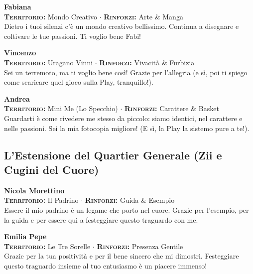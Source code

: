 \noindent\begin{minipage}{\linewidth}
\textbf{Fabiana} \\
{\footnotesize \textbf{\textsc{Territorio:}} Mondo Creativo $\cdot$ \textbf{\textsc{Rinforzi:}} Arte \& Manga} \\
Dietro i tuoi silenzi c'è un mondo creativo bellissimo. Continua a disegnare e coltivare le tue passioni. Ti voglio bene Fabi!
\end{minipage}
\vspace{0.6cm}

\noindent\begin{minipage}{\linewidth}
\textbf{Vincenzo} \\
{\footnotesize \textbf{\textsc{Territorio:}} Uragano Vinni $\cdot$ \textbf{\textsc{Rinforzi:}} Vivacità \& Furbizia} \\
Sei un terremoto, ma ti voglio bene così! Grazie per l'allegria (e sì, poi ti spiego come scaricare quel gioco sulla Play, tranquillo!).
\end{minipage}
\vspace{0.6cm}

\noindent\begin{minipage}{\linewidth}
\textbf{Andrea} \\
{\footnotesize \textbf{\textsc{Territorio:}} Mini Me (Lo Specchio) $\cdot$ \textbf{\textsc{Rinforzi:}} Carattere \& Basket} \\
Guardarti è come rivedere me stesso da piccolo: siamo identici, nel carattere e nelle passioni. Sei la mia fotocopia migliore! (E sì, la Play la sistemo pure a te!).
\end{minipage}

\subsection*{L'Estensione del Quartier Generale (Zii e Cugini del Cuore)}

\noindent\begin{minipage}{\linewidth}
\textbf{Nicola Morettino} \\
{\footnotesize \textbf{\textsc{Territorio:}} Il Padrino $\cdot$ \textbf{\textsc{Rinforzi:}} Guida \& Esempio} \\
Essere il mio padrino è un legame che porto nel cuore. Grazie per l'esempio, per la guida e per essere qui a festeggiare questo traguardo con me.
\end{minipage}
\vspace{0.6cm}

\noindent\begin{minipage}{\linewidth}
\textbf{Emilia Pepe} \\
{\footnotesize \textbf{\textsc{Territorio:}} Le Tre Sorelle $\cdot$ \textbf{\textsc{Rinforzi:}} Presenza Gentile} \\
Grazie per la tua positività e per il bene sincero che mi dimostri. Festeggiare questo traguardo insieme al tuo entusiasmo è un piacere immenso!
\end{minipage}
\vspace{0.6cm}

